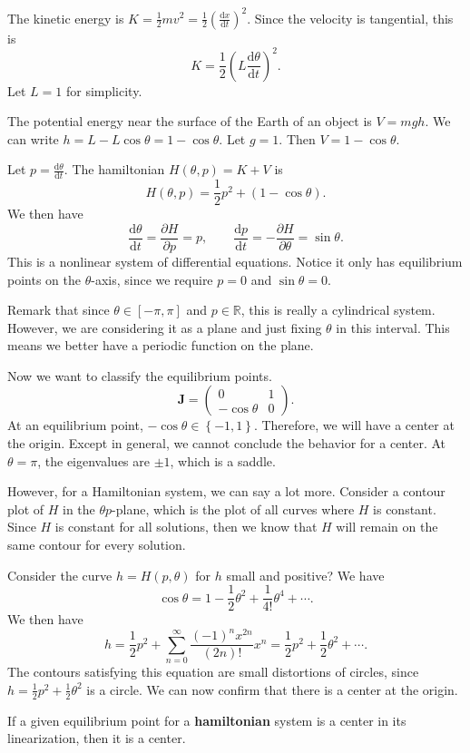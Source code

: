 The kinetic energy is $K=\frac{1}{2}mv^2=\frac{1}{2}\left( \frac{\mathrm{d}x}{\mathrm{d}t}  \right) ^2$. Since the velocity is tangential, this is
\[
	K=\frac{1}{2}\left( L \frac{\mathrm{d}\theta }{\mathrm{d}t}  \right) ^2
.\]
Let $L=1$ for simplicity.

The potential energy near the surface of the Earth of an object is $V=mgh$.  We can write $h=L-L\cos \theta =1-\cos \theta $. Let $g=1$. Then $V=1-\cos \theta $.

Let $p=\frac{\mathrm{d}\theta }{\mathrm{d}t} $. The hamiltonian $H(\theta ,p)=K+V$ is
\[
	H(\theta ,p)=\frac{1}{2}p^2+\left( 1-\cos \theta  \right) 
.\]
We then have
\[
	\frac{\mathrm{d}\theta }{\mathrm{d}t} =\frac{\partial H}{\partial p} =p,\qquad \frac{\mathrm{d}p}{\mathrm{d}t} =-\frac{\partial H}{\partial \theta } =\sin \theta 
.\]
This is a nonlinear system of differential equations. Notice it only has equilibrium points on the $\theta $-axis, since we require $p=0$ and $\sin \theta =0$.

Remark that since $\theta \in [-\pi ,\pi ]$ and $p\in\mathbb{R}$, this is really a cylindrical system. However, we are considering it as a plane and just fixing $\theta $ in this interval. This means we better have a periodic function on the plane.

Now we want to classify the equilibrium points.
\[
	\mathbf{J}=\begin{pmatrix}
		0&1\\
		-\cos \theta &0
	\end{pmatrix} 
.\]
At an equilibrium point, $-\cos \theta \in \left\{ -1,1 \right\} $. Therefore, we will have a center at the origin. Except in general, we cannot conclude the behavior for a center. At $\theta=\pi $, the eigenvalues are $\pm 1$, which is a saddle.

However, for a Hamiltonian system, we can say a lot more. Consider a contour plot of $H$ in the $\theta p$-plane, which is the plot of all curves where $H$ is constant. Since $H$ is constant for all solutions, then we know that $H$ will remain on the same contour for every solution.
 
Consider the curve $h=H(p,\theta )$ for $h$ small and positive? We have
\[
	\cos \theta =1-\frac{1}{2}\theta ^2+\frac{1}{4!}\theta ^4+\cdots
.\]
We then have
\[
h=	\frac{1}{2}p^2+\sum_{n=0}^{\infty} \frac{(-1)^nx^{2n}}{(2n)!}x^n=\frac{1}{2}p^2+\frac{1}{2}\theta ^2+\cdots
.\]
The contours satisfying this equation are small distortions of circles, since $h=\frac{1}{2}p^2+\frac{1}{2}\theta ^2$ is a circle. We can now confirm that there is a center at the origin.
\begin{proposition}
	If a given equilibrium point for a \textbf{hamiltonian} system is a center in its linearization, then it is a center.
\end{proposition}


